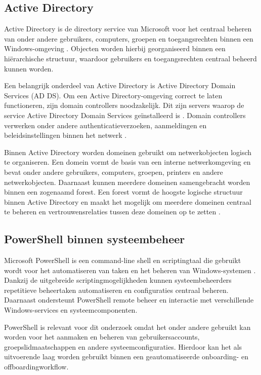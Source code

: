 \subsection{Active Directory}

Active Directory is de directory service van Microsoft voor het centraal beheren van onder andere gebruikers, computers, groepen en toegangsrechten binnen een Windows-omgeving \autocite{Microsofta}. Objecten worden hierbij georganiseerd binnen een hiërarchische structuur, waardoor gebruikers en toegangsrechten centraal beheerd kunnen worden.

Een belangrijk onderdeel van Active Directory is Active Directory Domain Services (AD DS). Om een Active Directory-omgeving correct te laten functioneren, zijn domain controllers noodzakelijk. Dit zijn servers waarop de service Active Directory Domain Services geïnstalleerd is \autocite{Microsoftb}. Domain controllers verwerken onder andere authenticatieverzoeken, aanmeldingen en beleidsinstellingen binnen het netwerk \autocite{Microsoftb}.

Binnen Active Directory worden domeinen gebruikt om netwerkobjecten logisch te organiseren. Een domein vormt de basis van een interne netwerkomgeving en bevat onder andere gebruikers, computers, groepen, printers en andere netwerkobjecten. Daarnaast kunnen meerdere domeinen samengebracht worden binnen een zogenaamd forest. Een forest vormt de hoogste logische structuur binnen Active Directory en maakt het mogelijk om meerdere domeinen centraal te beheren en vertrouwensrelaties tussen deze domeinen op te zetten \autocite{Microsoftb}.

\subsection{PowerShell binnen systeembeheer}

Microsoft PowerShell is een command-line shell en scriptingtaal die gebruikt wordt voor het automatiseren van taken en het beheren van Windows-systemen \autocite{SentinelOne2025}. Dankzij de uitgebreide scriptingmogelijkheden kunnen systeembeheerders repetitieve beheertaken automatiseren en configuraties centraal beheren. Daarnaast ondersteunt PowerShell remote beheer en interactie met verschillende Windows-services en systeemcomponenten.

PowerShell is relevant voor dit onderzoek omdat het onder andere gebruikt kan worden voor het aanmaken en beheren van gebruikersaccounts, groepslidmaatschappen en andere systeemconfiguraties. Hierdoor kan het als uitvoerende laag worden gebruikt binnen een geautomatiseerde onboarding- en offboardingworkflow.


